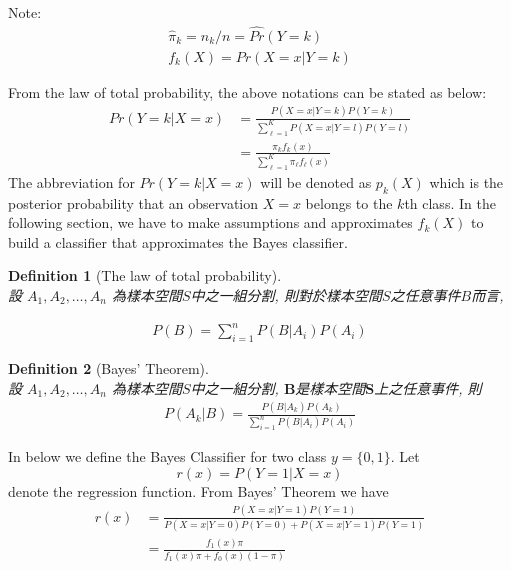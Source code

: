\documentclass[12pt,a4paper]{article}%
\newtheorem{definition}{Definition}
\theoremstyle{definition}
\theoremstyle{plain}
\numberwithin{equation}{section}
\begin{document}
\begin{framed}
Note:
\begin{gather*}
\hat{\pi}_{k} = n_{k}/n = \hat{Pr}(Y=k) \\
f_{k}(X) = Pr(X=x|Y=k)
\end{gather*}
\end{framed}
From the law of total probability, the above notations can be stated as below:
\begin{align*}
Pr(Y=k|X=x) &= \frac{P(X=x|Y=k)P(Y=k)}{\sum\limits_{\ell=1}^{K} P(X=x|Y=l)P(Y=l)} \\
  	        &= \frac{\pi_{k}f_{k}(x)}{\sum\limits_{\ell=1}^{K}\pi_{\ell}f_{\ell}(x)}
\label{lda}
\end{align*}
The abbreviation for $Pr(Y=k|X=x)$ will be denoted as $p_{k}(X)$ which is the posterior probability that an observation $X=x$ belongs to the $k$th class.
In the following section, we have to make assumptions and approximates $f_{k}(X)$ to build a classifier that approximates the Bayes classifier.

\begin{framed}
\begin{CJK}{UTF8}{cwmb}
\begin{definition}[The law of total probability]
~\\
設 $A_{1},A_{2},\dots,A_{n}$ 為樣本空間$S$中之一組分割, 則對於樣本空間$S$之任意事件$B$而言, 

\begin{gather*}
P(B) = \sum\limits_{i=1}^{n}P(B|A_{i})P(A_{i})
\end{gather*}
\end{definition}
\end{CJK}
\end{framed}

\begin{framed}
\begin{CJK}{UTF8}{cwmb}
\begin{definition}[Bayes' Theorem]
~\\
設 $A_{1},A_{2},\dots,A_{n}$ 為樣本空間$S$中之一組分割, $\mathbf{B}$是樣本空間$\mathbf{S}$上之任意事件, 則
\begin{gather*}
P(A_{k}|B) = \frac{P(B|A_{k})P(A_{k})}{\sum\limits_{i=1}^{n}P(B|A_{i})P(A_{i})}
\end{gather*}
\end{definition}
\end{CJK}
\end{framed}
In below we define the Bayes Classifier for two class $y=\{0,1\}$. Let 
\begin{equation}
r(x) = P(Y=1|X=x)
\end{equation}
denote the regression function. From Bayes' Theorem we have
\begin{align*}
r(x) &= \frac{P(X=x|Y=1)P(Y=1)}{P(X=x|Y=0)P(Y=0)+P(X=x|Y=1)P(Y=1)} \\
	 &= \frac{f_{1}(x)\pi}{f_{1}(x)\pi + f_{0}(x)(1-\pi)}
\end{align*}
\end{document}
